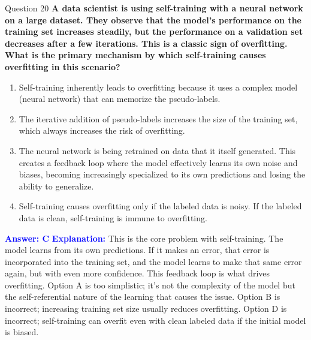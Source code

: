\documentclass[8pt]{beamer}  %
\begin{document}
	\begin{frame}{Question 20}
		\textbf{A data scientist is using self-training with a neural network on a large dataset. They observe that the model's performance on the training set increases steadily, but the performance on a validation set decreases after a few iterations. This is a classic sign of overfitting. What is the primary mechanism by which self-training causes overfitting in this scenario?}
		\begin{enumerate}
			\item Self-training inherently leads to overfitting because it uses a complex model (neural network) that can memorize the pseudo-labels.
			\item The iterative addition of pseudo-labels increases the size of the training set, which always increases the risk of overfitting.
			\item The neural network is being retrained on data that it itself generated. This creates a feedback loop where the model effectively learns its own noise and biases, becoming increasingly specialized to its own predictions and losing the ability to generalize.
			\item Self-training causes overfitting only if the labeled data is noisy. If the labeled data is clean, self-training is immune to overfitting.
		\end{enumerate}
		\vspace{0.2cm}
		\textcolor{blue}{\textbf{Answer: C}}
		\vspace{0.2cm}
		\textcolor{blue}{\textbf{Explanation:}} This is the core problem with self-training. The model learns from its own predictions. If it makes an error, that error is incorporated into the training set, and the model learns to make that same error again, but with even more confidence. This feedback loop is what drives overfitting. Option A is too simplistic; it's not the complexity of the model but the self-referential nature of the learning that causes the issue. Option B is incorrect; increasing training set size usually reduces overfitting. Option D is incorrect; self-training can overfit even with clean labeled data if the initial model is biased.
	\end{frame}
	
\end{document}
